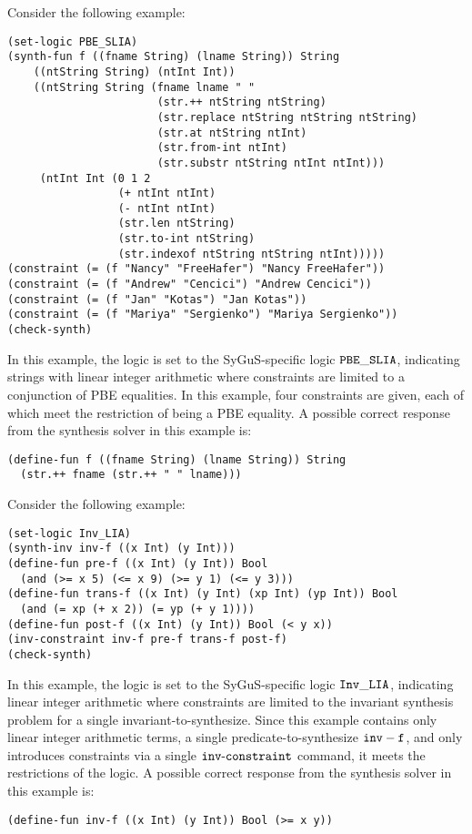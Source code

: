\documentclass[english,a4paper,10pt]{article}
\begin{document}
\begin{example}
Consider the following example:
\begin{lstlisting}[basicstyle={\ttfamily}]
(set-logic PBE_SLIA)
(synth-fun f ((fname String) (lname String)) String
    ((ntString String) (ntInt Int))
    ((ntString String (fname lname " "
                       (str.++ ntString ntString)
                       (str.replace ntString ntString ntString)
                       (str.at ntString ntInt)
                       (str.from-int ntInt)
                       (str.substr ntString ntInt ntInt)))
     (ntInt Int (0 1 2
                 (+ ntInt ntInt)
                 (- ntInt ntInt)
                 (str.len ntString)
                 (str.to-int ntString)
                 (str.indexof ntString ntString ntInt)))))
(constraint (= (f "Nancy" "FreeHafer") "Nancy FreeHafer"))
(constraint (= (f "Andrew" "Cencici") "Andrew Cencici"))
(constraint (= (f "Jan" "Kotas") "Jan Kotas"))
(constraint (= (f "Mariya" "Sergienko") "Mariya Sergienko"))
(check-synth)
\end{lstlisting}
In this example, the logic is set to the SyGuS-specific logic
${\tt PBE\_SLIA}$, indicating strings with linear integer arithmetic
where constraints are limited to a conjunction of PBE equalities.
In this example, four constraints are given, each of which meet the
restriction of being a PBE equality.
A possible correct response from the synthesis solver in this example is:
\begin{lstlisting}[basicstyle={\ttfamily}]
(define-fun f ((fname String) (lname String)) String
  (str.++ fname (str.++ " " lname)))
\end{lstlisting}
\end{example}

\begin{example}
Consider the following example:
\begin{lstlisting}[basicstyle={\ttfamily}]
(set-logic Inv_LIA)
(synth-inv inv-f ((x Int) (y Int)))
(define-fun pre-f ((x Int) (y Int)) Bool 
  (and (>= x 5) (<= x 9) (>= y 1) (<= y 3)))
(define-fun trans-f ((x Int) (y Int) (xp Int) (yp Int)) Bool 
  (and (= xp (+ x 2)) (= yp (+ y 1))))
(define-fun post-f ((x Int) (y Int)) Bool (< y x))
(inv-constraint inv-f pre-f trans-f post-f)
(check-synth)
\end{lstlisting}
In this example, the logic is set to the SyGuS-specific logic
${\tt Inv\_LIA}$, indicating linear integer arithmetic
where constraints are limited to the invariant synthesis problem for
a single invariant-to-synthesize.
Since this example contains only linear integer arithmetic terms,
a single predicate-to-synthesize ${\tt inv-f}$,
and only introduces constraints via a single ${\tt inv\mbox{-}constraint}$ command,
it meets the restrictions of the logic.
A possible correct response from the synthesis solver in this example is:
\begin{lstlisting}[basicstyle={\ttfamily}]
(define-fun inv-f ((x Int) (y Int)) Bool (>= x y))
\end{lstlisting}
\end{example}
\end{document}
